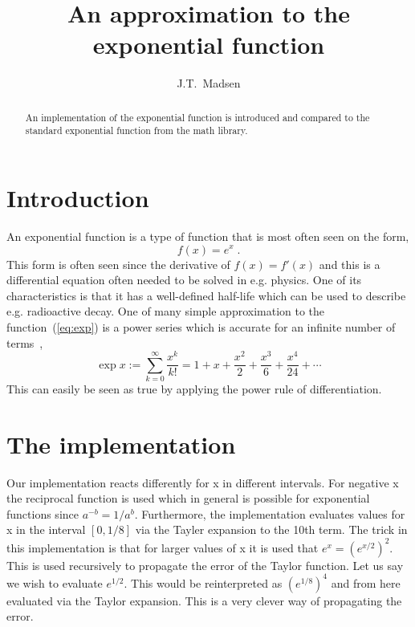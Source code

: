 \documentclass[twocolumn]{article}
\title{An approximation to the exponential function}
\author{J.T.~Madsen}
\date{}
\begin{document}
\maketitle

\begin{abstract}
An implementation of the exponential function is introduced
and compared to the standard exponential function from the math library.
\end{abstract}

\section{Introduction}
An exponential function is a type of function that is most often seen on the form,
	\begin{equation}\label{eq:exp}
f(x)=e^x \;.
	\end{equation}
This form is often seen since the derivative of $f(x)=f'(x)$ and this is a differential equation
often needed to be solved in e.g. physics. One of its characteristics is that it has a
well-defined half-life which can be used to describe e.g. radioactive decay.
One of many simple approximation to the function~(\ref{eq:exp}) is
a power series which is accurate for an infinite number of terms~\cite{rudin-walter},
	\begin{equation}\label{eq:walter}
\exp x := \sum_{k = 0}^{\infty} \frac{x^k}{k!}
 = 1 + x + \frac{x^2}{2} + \frac{x^3}{6} + \frac{x^4}{24} + \cdots
	\end{equation}
This can easily be seen as true by applying the power rule of differentiation.

\section{The implementation}
Our implementation reacts differently for x in different intervals. For negative x 
the reciprocal function is used which in general is possible for exponential functions since 
$a^{-b}=1/a^b$. 
Furthermore, the implementation evaluates values for x in the interval $[0,1/8]$
via the Tayler expansion to the 10th term.
The trick in this implementation is that for larger values of x 
it is used that $e^x=(e^{x/2})^2$. This is used recursively to propagate the error 
of the Taylor function. Let us say we wish to evaluate $e^{1/2}$. This would be 
reinterpreted as $(e^{1/8})^4$ and from here evaluated via the Taylor expansion.
This is a very clever way of propagating the error.
\end{document}
